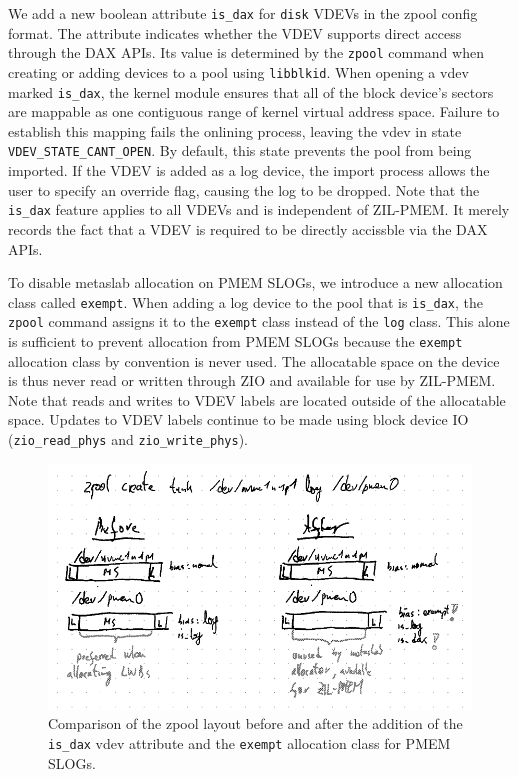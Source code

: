 \documentclass[12pt,a4paper,twoside]{book}
\begin{document}
We add a new boolean attribute \lstinline{is_dax} for \lstinline{disk} VDEVs in the zpool config format.
The attribute indicates whether the VDEV supports direct access through the DAX APIs.
Its value is determined by the \lstinline{zpool} command when creating or adding devices to a pool using \lstinline{libblkid}.
When opening a vdev marked \lstinline{is_dax}, the kernel module ensures that all of the block device's sectors are mappable as one contiguous range of kernel virtual address space.
Failure to establish this mapping fails the onlining process, leaving the vdev in state \lstinline{VDEV_STATE_CANT_OPEN}.
By default, this state prevents the pool from being imported.
If the VDEV is added as a log device, the import process allows the user to specify an override flag, causing the log to be dropped.
Note that the \lstinline{is_dax} feature applies to all VDEVs and is independent of ZIL-PMEM.
It merely records the fact that a VDEV is required to be directly accissble via the DAX APIs.

To disable metaslab allocation on PMEM SLOGs, we introduce a new allocation class called \lstinline{exempt}.
When adding a log device to the pool that is \lstinline{is_dax}, the \lstinline{zpool} command assigns it to the \lstinline{exempt} class instead of the \lstinline{log} class.
This alone is sufficient to prevent allocation from PMEM SLOGs because the \lstinline{exempt} allocation class by convention is never used.
The allocatable space on the device is thus never read or written through ZIO and available for use by ZIL-PMEM.
Note that reads and writes to VDEV labels are located outside of the allocatable space.
Updates to VDEV labels continue to be made using block device IO (\lstinline{zio_read_phys} and \lstinline{zio_write_phys}).

\begin{figure}[h]
    \includegraphics[width=\textwidth]{fig/pmem_aware_vdev_layer_before_after}
    \caption{
        Comparison of the zpool layout before and after the addition of the \lstinline{is_dax} vdev attribute and the \lstinline{exempt} allocation class for PMEM SLOGs.
    }
\end{figure}
\end{document}
